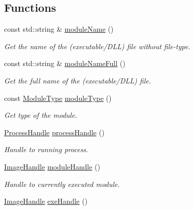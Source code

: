 \subsection*{Functions}
\begin{DoxyCompactItemize}
\item 
const std::string \& \hyperlink{namespaceSystem_add155d288552032434ee9e25d130ad72}{moduleName} ()
\begin{DoxyCompactList}\small\item\em Get the name of the (executable/DLL) file without file-\/type. \item\end{DoxyCompactList}\item 
const std::string \& \hyperlink{namespaceSystem_abbb9e2ab2f883bfe24805d89bef43792}{moduleNameFull} ()
\begin{DoxyCompactList}\small\item\em Get the full name of the (executable/DLL) file. \item\end{DoxyCompactList}\item 
const \hyperlink{namespaceSystem_a12d36cf455e22c1e75ef65a2105df4c5}{ModuleType} \hyperlink{namespaceSystem_aa0cb1193baa6883c2686a0a87d56d228}{moduleType} ()
\begin{DoxyCompactList}\small\item\em Get type of the module. \item\end{DoxyCompactList}\item 
\hyperlink{namespaceSystem_a7490ee4911e28ad26aa0fcdd00a629df}{ProcessHandle} \hyperlink{namespaceSystem_a563f947d4a2921f4348ff4f8e909a9f2}{processHandle} ()
\begin{DoxyCompactList}\small\item\em Handle to running process. \item\end{DoxyCompactList}\item 
\hyperlink{namespaceSystem_a21dca3f6170a2b0a0ea3028040ba21b3}{ImageHandle} \hyperlink{namespaceSystem_ab88d0de1d6850b6f95522e9c242eeab0}{moduleHandle} ()
\begin{DoxyCompactList}\small\item\em Handle to currently executed module. \item\end{DoxyCompactList}\item 
\hyperlink{namespaceSystem_a21dca3f6170a2b0a0ea3028040ba21b3}{ImageHandle} \hyperlink{namespaceSystem_a89399871d8d0f573f39f97f7f4a6320b}{exeHandle} ()

\end{DoxyCompactItemize}
